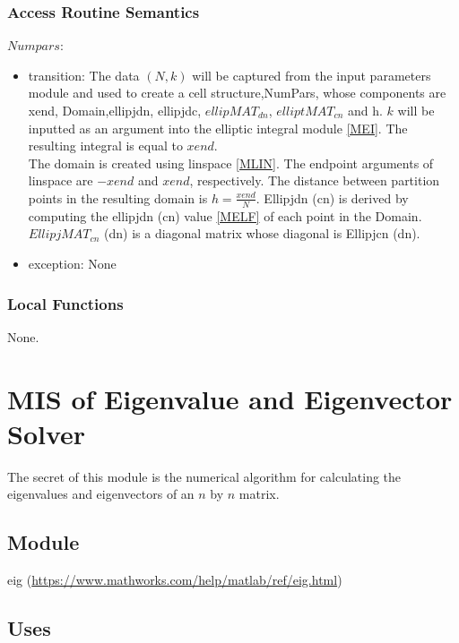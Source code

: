 \documentclass[12pt, titlepage]{article}
\begin{document}
\subsubsection{Access Routine Semantics}

\noindent $Numpars$:
\begin{itemize}
	\item transition: The data $(N,k)$ will be captured from the input 
	parameters module and used to create a cell structure,NumPars, whose 
	components are xend, Domain,ellipjdn, 
	ellipjdc, $ellipMAT_{dn}$, 
	$elliptMAT_{cn}$ and h. $k$ will be 
	inputted as 
	an argument into the elliptic integral module \ref{MEI}. The resulting 
	integral is 
	equal to $xend$. \\ 
	The domain is created using linspace \ref{MLIN}. The endpoint arguments of 
	linspace 
	are $-xend$ and $xend$, respectively. The distance between partition points 
	in the resulting domain is $h=\frac{xend}{N}$. Ellipjdn (cn) is derived by 
	computing the ellipjdn (cn) value \ref{MELF} of each point in the Domain. 
	$EllipjMAT_{cn}$ (dn) is a 
	diagonal matrix whose diagonal is Ellipjcn (dn). 
	\item exception: None
\end{itemize} 

\subsubsection{Local Functions} 

None. 

\newpage

\section{MIS of Eigenvalue and Eigenvector Solver} \label{SEES}

The secret of this module is the numerical algorithm for calculating the 
eigenvalues and eigenvectors of an $n$ by $n$ matrix.

\subsection{Module}

eig (\url{https://www.mathworks.com/help/matlab/ref/eig.html})

\subsection{Uses}
\end{document}
